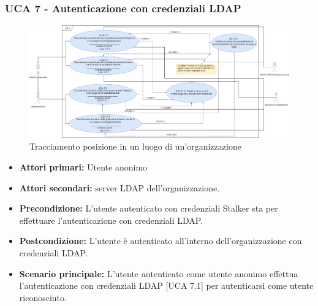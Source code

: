 \subsubsection{UCA 7 - Autenticazione con credenziali LDAP}%

\begin{figure}[h]
	\centering
	\includegraphics[scale=0.3]{sezioni/UseCase/Immagini/UCA6.png}
	\caption{Tracciamento posizione in un luogo di un'organizzazione}
\end{figure}

\begin{itemize}
	\item \textbf{Attori primari:} Utente anonimo 
	\item \textbf{Attori secondari:} server LDAP dell'organizzazione.
	\item \textbf{Precondizione:} L'utente autenticato con credenziali Stalker sta per effettuare l'autenticazione con credenziali LDAP.
	\item \textbf{Postcondizione:} L'utente è autenticato all'interno dell'organizzazione con credenziali LDAP.
	\item \textbf{Scenario principale:} L'utente autenticato come utente anonimo effettua l'autenticazione con credenziali LDAP [UCA 7.1] per autenticarsi come utente riconosciuto.
\end{itemize}

